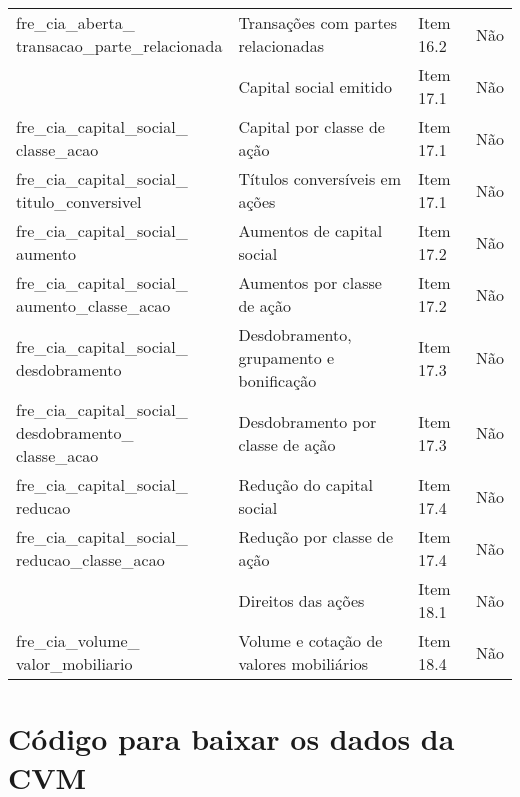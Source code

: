 \documentclass[recuosum=1.5cm]{iftex2024}
\newcounter{codigo}[chapter]
\begin{document}
\begin{longtable}{p{5cm} p{5cm} p{2.5cm} p{2cm}}
	\makecell[l]{fre\_cia\_aberta\_\\transacao\_parte\_relacionada} & Transações com partes relacionadas & Item 16.2 & Não \\
	\makecell[l]{fre\_cia\_capital\_social} & Capital social emitido & Item 17.1 & Não \\
	\makecell[l]{fre\_cia\_capital\_social\_\\classe\_acao} & Capital por classe de ação & Item 17.1 & Não \\
	\makecell[l]{fre\_cia\_capital\_social\_\\titulo\_conversivel} & Títulos conversíveis em ações & Item 17.1 & Não \\
	\makecell[l]{fre\_cia\_capital\_social\_\\aumento} & Aumentos de capital social & Item 17.2 & Não \\
	\makecell[l]{fre\_cia\_capital\_social\_\\aumento\_classe\_acao} & Aumentos por classe de ação & Item 17.2 & Não \\
	\makecell[l]{fre\_cia\_capital\_social\_\\desdobramento} & Desdobramento, grupamento e bonificação & Item 17.3 & Não \\
	\makecell[l]{fre\_cia\_capital\_social\_\\desdobramento\_\\classe\_acao} & Desdobramento por classe de ação & Item 17.3 & Não \\
	\makecell[l]{fre\_cia\_capital\_social\_\\reducao} & Redução do capital social & Item 17.4 & Não \\
	\makecell[l]{fre\_cia\_capital\_social\_\\reducao\_classe\_acao} & Redução por classe de ação & Item 17.4 & Não \\
	\makecell[l]{fre\_cia\_direito\_acao} & Direitos das ações & Item 18.1 & Não \\
	\makecell[l]{fre\_cia\_volume\_\\valor\_mobiliario} & Volume e cotação de valores mobiliários & Item 18.4 & Não \\
	
	\bottomrule
\end{longtable}
\begin{flushleft}
\end{flushleft}




\chapter{Código para baixar os dados da CVM}
\label{ap:codigo-baixar}

\end{document}
